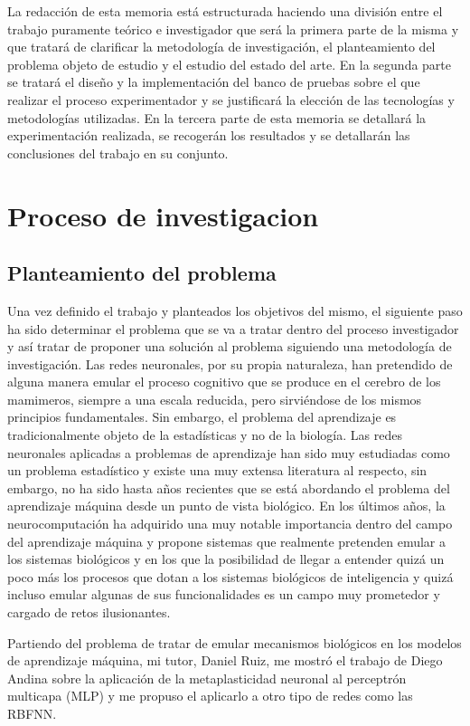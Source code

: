 \documentclass[10pt,a4paper, twocolumn]{report}
\begin{document}
La redacción de esta memoria está estructurada haciendo una división entre el trabajo puramente teórico e investigador que será la primera parte de la misma y que tratará de clarificar la metodología de investigación, el planteamiento del problema objeto de estudio y el estudio del estado del arte. En la segunda parte se tratará el diseño y la implementación del banco de pruebas sobre el que realizar el proceso experimentador y se justificará la elección de las tecnologías y metodologías utilizadas. En la tercera parte de esta memoria se detallará la experimentación realizada, se recogerán los resultados y se detallarán las conclusiones del trabajo en su conjunto. 

\section{Proceso de investigacion}
\subsection{Planteamiento del problema}
Una vez definido el trabajo y planteados los objetivos del mismo, el siguiente paso ha sido determinar el problema que se va a tratar dentro del proceso investigador y así tratar de proponer una solución al problema siguiendo una metodología de investigación.
Las redes neuronales, por su propia naturaleza, han pretendido de alguna manera emular el proceso cognitivo que se produce en el cerebro de los mamimeros, siempre a una escala reducida, pero sirviéndose de los mismos principios fundamentales. Sin embargo, el problema del aprendizaje es tradicionalmente objeto de la estadísticas y no de la biología. Las redes neuronales aplicadas a problemas de aprendizaje han sido muy estudiadas como un problema estadístico y existe una muy extensa literatura al respecto, sin embargo, no ha sido hasta años recientes que se está abordando el problema del aprendizaje máquina desde un punto de vista biológico. En los últimos años, la neurocomputación ha adquirido una muy notable importancia dentro del campo del aprendizaje máquina y propone sistemas que realmente pretenden emular a los sistemas biológicos y en los que la posibilidad de llegar a entender quizá un poco más los procesos que dotan a los sistemas biológicos de inteligencia y quizá incluso emular algunas de sus funcionalidades es un campo muy prometedor y cargado de retos ilusionantes.

Partiendo del problema de tratar de emular mecanismos biológicos en los modelos de aprendizaje máquina, mi tutor, Daniel Ruiz, me mostró el trabajo de Diego Andina sobre la aplicación de la metaplasticidad neuronal al perceptrón multicapa (MLP) y me propuso el aplicarlo a otro tipo de redes como las RBFNN.
\end{document}
